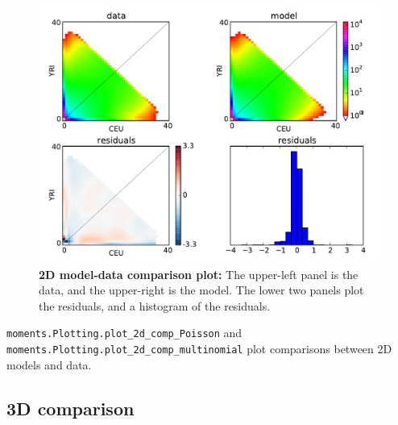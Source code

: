 \documentclass[12pt]{article}
\makeatletter
\newcommand{\py}[1]{\lstinline[language=Python, showstringspaces=False]@#1@}
\makeatother
\begin{document}
\begin{figure}
\centering
\includegraphics[scale=0.5]{2d_comp}
\caption{\textbf{2D model-data comparison plot:} The upper-left panel is the data, and the upper-right is the model. The lower two panels plot the residuals, and a histogram of the residuals.\label{fig:2d_comp}}
\end{figure}

\py{moments.Plotting.plot_2d_comp_Poisson} and \py{moments.Plotting.plot_2d_comp_multinomial} plot comparisons between 2D models and data.

\subsection{3D comparison}
\end{document}
